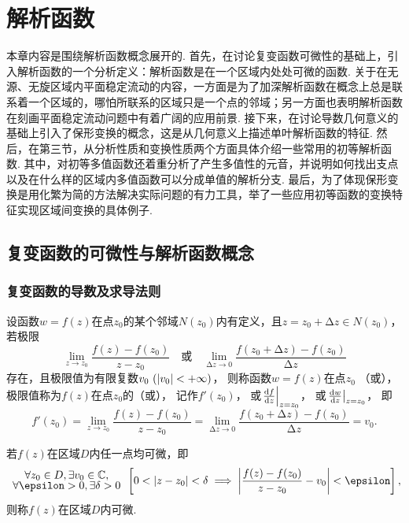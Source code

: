 \chapter{解析函数}
本章内容是围绕解析函数概念展开的.
首先，在讨论复变函数可微性的基础上，引入解析函数的一个分析定义：解析函数是在一个区域内处处可微的函数.
关于在无源、无旋区域内平面稳定流动的内容，一方面是为了加深解析函数在概念上总是联系着一个区域的，哪怕所联系的区域只是一个点的邻域；另一方面也表明解析函数在刻画平面稳定流动问题中有着广阔的应用前景.
接下来，在讨论导数几何意义的基础上引入了保形变换的概念，这是从几何意义上描述单叶解析函数的特征.
然后，在第三节，从分析性质和变换性质两个方面具体介绍一些常用的初等解析函数.
其中，对初等多值函数还着重分析了产生多值性的元音，并说明如何找出支点以及在什么样的区域内多值函数可以分成单值的解析分支.
最后，为了体现保形变换是用化繁为简的方法解决实际问题的有力工具，举了一些应用初等函数的变换特征实现区域间变换的具体例子.

\section{复变函数的可微性与解析函数概念}
\subsection{复变函数的导数及求导法则}
\begin{definition}
设函数\(w=f(z)\)在点\(z_0\)的某个邻域\(N(z_0)\)内有定义，且\(z=z_0+\increment z \in N(z_0)\)，若极限\[
\lim\limits_{z \to z_0} \frac{f(z)-f(z_0)}{z-z_0}
\quad\text{或}\quad
\lim\limits_{\increment z\to0} \frac{f(z_0+\increment z)-f(z_0)}{\increment z}
\]存在，且极限值为有限复数\(v_0\ (\abs{v_0}<+\infty)\)，
则称函数\(w=f(z)\)在点\(z_0\) （或），
极限值称为\(f(z)\)在点\(z_0\)的（或），
记作\(f'(z_0)\)，
或\(\eval{\dv{f}{z}}_{z=z_0}\)，
或\(\eval{\dv{w}{z}}_{z=z_0}\)，
即\begin{equation}\label{equation:解析函数.导数的定义式}
	f'(z_0)
	= \lim\limits_{z \to z_0} \frac{f(z)-f(z_0)}{z-z_0}
	= \lim\limits_{\increment z\to0} \frac{f(z_0+\increment z)-f(z_0)}{\increment z}
	= v_0.
\end{equation}

若\(f(z)\)在区域\(D\)内任一点均可微，即\[
{ \def\arraystretch{.7} \begin{array}{c}
\forall z_0 \in D, \exists v_0 \in \mathbb{C}, \\
\forall \epsilon > 0, \exists \delta > 0
\end{array} }
\left[
0 < \abs{z - z_0} < \delta
\implies
\abs{\frac{f(z) - f(z_0)}{z - z_0} - v_0} < \epsilon
\right],
\]则称\(f(z)\)在区域\(D\)内可微.
\end{definition}

